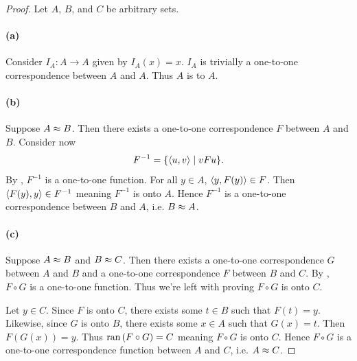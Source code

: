 \documentclass{report}
\begin{document}
  \begin{proof}

    Let $A$, $B$, and $C$ be arbitrary sets.

    \paragraph{(a)}%

      Consider  $I_A \colon A \rightarrow A$ given by
        $I_A(x) = x$.
      $I_A$ is trivially a one-to-one correspondence between $A$ and $A$.
      Thus $A$ is  to $A$.

    \paragraph{(b)}%

      Suppose $A \approx B$.
      Then there exists a one-to-one correspondence $F$ between $A$ and $B$.
      Consider now  $$F^{-1} = \{\left< u, v \right> \mid vFu\}.$$
      By , $F^{-1}$ is a one-to-one function.
      For all $y \in A$, $\left< y, F(y) \right> \in F$.
      Then $\left< F(y), y \right> \in F^{-1}$ meaning $F^{-1}$ is onto $A$.
      Hence $F^{-1}$ is a one-to-one correspondence between $B$ and $A$, i.e.
        $B \approx A$.

    \paragraph{(c)}%

      Suppose $A \approx B$ and $B \approx C$.
      Then there exists a one-to-one correspondence $G$ between $A$ and $B$ and
        a one-to-one correspondence $F$ between $B$ and $C$.
      By , $F \circ G$ is a one-to-one
        function.
      Thus we're left with proving $F \circ G$ is onto $C$.

      Let $y \in C$.
      Since $F$ is onto $C$, there exists some $t \in B$ such that $F(t) = y$.
      Likewise, since $G$ is onto $B$, there exists some $x \in A$ such that
        $G(x) = t$.
      Then $F(G(x)) = y$.
      Thus $\mathop{\text{ran}}{(F \circ G)} = C$ meaning $F \circ G$ is onto $C$.
      Hence $F \circ G$ is a one-to-one correspondence function between $A$ and
        $C$, i.e. $A \approx C$.

  \end{proof}

\subsection{}%
\end{document}
